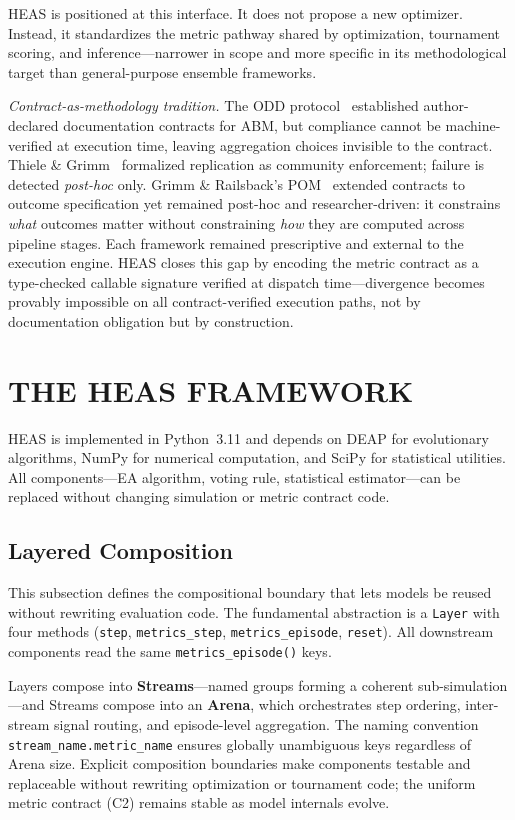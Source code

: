 \documentclass{wscpaperproc}
\begin{document}
HEAS is positioned at this interface. It does not propose a new optimizer.
Instead, it standardizes the metric pathway shared by optimization, tournament
scoring, and inference---narrower in scope and more specific in its methodological target
than general-purpose ensemble frameworks.

\textit{Contract-as-methodology tradition.}
The ODD protocol~\cite{grimm2006odd} established author-declared documentation
contracts for ABM, but compliance cannot be machine-verified at execution time,
leaving aggregation choices invisible to the contract. Thiele \&
Grimm~\cite{thiele2015replicating} formalized replication as community enforcement;
failure is detected \emph{post-hoc} only. Grimm \& Railsback's
POM~\cite{grimm2012pattern} extended contracts to outcome specification yet
remained post-hoc and researcher-driven: it constrains \emph{what} outcomes matter
without constraining \emph{how} they are computed across pipeline stages. Each
framework remained prescriptive and external to the execution engine. HEAS closes
this gap by encoding the metric contract as a type-checked callable signature
verified at dispatch time---divergence becomes provably impossible on all
contract-verified execution paths, not by documentation obligation but by
construction.

\section{THE HEAS FRAMEWORK}

HEAS is implemented in Python~3.11 and depends on DEAP for evolutionary
algorithms, NumPy for numerical computation, and SciPy for statistical
utilities. All components---EA algorithm, voting rule, statistical
estimator---can be replaced without changing simulation or metric contract code.

\subsection{Layered Composition}

This subsection defines the compositional boundary that lets models be reused
without rewriting evaluation code. The fundamental abstraction is a
\texttt{Layer} with four methods
(\texttt{step}, \texttt{metrics\_step}, \texttt{metrics\_episode},
\texttt{reset}). All downstream components read the same
\texttt{metrics\_episode()} keys.

Layers compose into \textbf{Streams}---named groups forming a coherent
sub-simulation---and Streams compose into an \textbf{Arena}, which orchestrates
step ordering, inter-stream signal routing, and episode-level aggregation. The
naming convention \texttt{stream\_name.metric\_name} ensures globally unambiguous
keys regardless of Arena size. Explicit composition boundaries make components
testable and replaceable without rewriting optimization or tournament code;
the uniform metric contract (C2) remains stable as model internals evolve.
\end{document}
